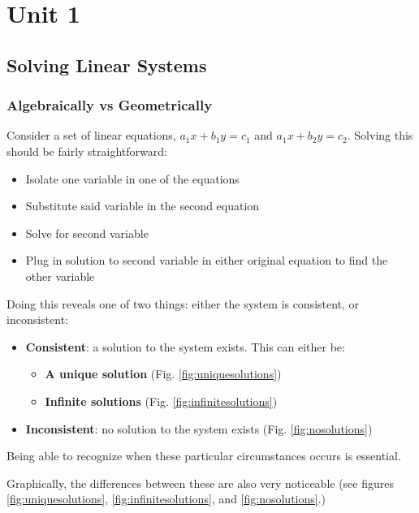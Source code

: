 \documentclass[12pt]{article}
\begin{document}
{
  \hypersetup{linkcolor=violet}
  \tableofcontents
}
\newpage
\pagestyle{mypage}
\section{Unit 1}
\subsection{Solving Linear Systems}
\subsubsection{Algebraically vs Geometrically}
Consider a set of linear equations, $a_1 x+b_1 y = c_1$ and $a_1 x+b_2 y = c_2$. Solving this should be fairly straightforward:
\begin{itemize}
    \item Isolate one variable in one of the equations
    \item Substitute said variable in the second equation
    \item Solve for second variable
    \item Plug in solution to second variable in either original equation to find the other variable
\end{itemize}

Doing this reveals one of two things: either the system is consistent, or inconsistent:

\begin{itemize}\label{list:solntypes}
    \item \textbf{Consistent}: a solution to the system exists. This can either be:
    \begin{itemize}
        \item \textbf{A unique solution} (Fig. \ref{fig:uniquesolutions})
        \item \textbf{Infinite solutions} (Fig. \ref{fig:infinitesolutions})
    \end{itemize}
    \item \textbf{Inconsistent}: no solution to the system exists (Fig. \ref{fig:nosolutions})
\end{itemize}

Being able to recognize when these particular circumstances occurs is essential.

Graphically, the differences between these are also very noticeable (see figures  \ref{fig:uniquesolutions}, \ref{fig:infinitesolutions}, and \ref{fig:nosolutions}.)
\end{document}
